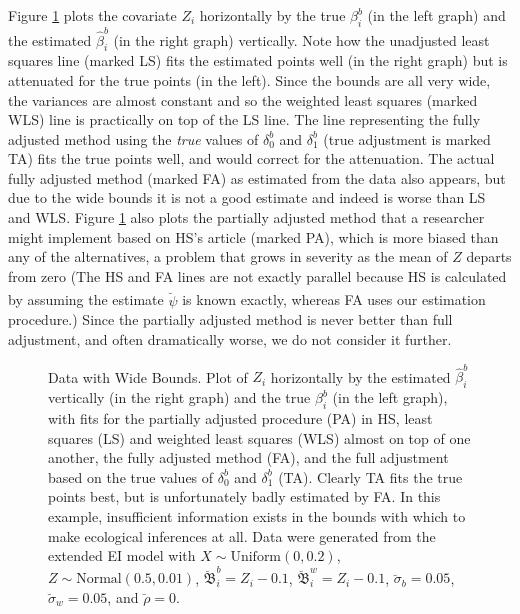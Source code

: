 \documentclass[11pt,titlepage]{article}
\newcommand{\bbeta}{{\mathfrak B}}
\newcommand{\sigmau}{\breve{\sigma}}
\newcommand{\rhou}{\breve{\rho}}
\newcommand{\psiu}{\breve{\psi}}
\begin{document}
Figure \ref{f:wide} plots the covariate $Z_i$ horizontally by the true
$\beta_i^b$ (in the left graph) and the estimated $\hat\beta_i^b$ (in
the right graph) vertically.  Note how the unadjusted least squares
line (marked LS) fits the estimated points well (in the right graph)
but is attenuated for the true points (in the left).  Since the
bounds are all very wide, the variances are almost constant and so the
weighted least squares (marked WLS) line is practically on top of the
LS line.  The line representing the fully adjusted method using the
\emph{true} values of $\delta_0^b$ and $\delta_1^b$ (true adjustment
is marked TA) fits the true points well, and would correct for the
attenuation.  The actual fully adjusted method (marked FA) as
estimated from the data also appears, but due to the wide bounds it is
not a good estimate and indeed is worse than LS and WLS.  Figure
\ref{f:wide} also plots the partially adjusted method that a
researcher might implement based on HS's article (marked PA), which is
more biased than any of the alternatives, a problem that grows in
severity as the mean of $Z$ departs from zero (The HS and FA lines are
not exactly parallel because HS is calculated by assuming the estimate
$\hat\psiu$ is known exactly, whereas FA uses our estimation
procedure.)  Since the partially adjusted method is never better than
full adjustment, and often dramatically worse, we do not consider it
further.
\begin{figure}[t]
  \begin{center}
    \caption{Data with Wide Bounds. Plot of $Z_i$ horizontally by
      the estimated $\hat\beta_i^b$ vertically (in the right graph)
      and the true $\beta_i^b$ (in the left graph), with fits for the
      partially adjusted procedure (PA) in HS, least squares (LS) and
      weighted least squares (WLS) almost on top of one another, the
      fully adjusted method (FA), and the full adjustment based on the
      true values of $\delta_0^b$ and $\delta_1^b$ (TA).  Clearly TA
      fits the true points best, but is unfortunately badly estimated
      by FA.  In this example, insufficient information exists in the
      bounds with which to make ecological inferences at all.  Data
      were generated from the extended EI model with $X \sim
      \textrm{Uniform}(0,0.2)$, $Z \sim \textrm{Normal}(0.5,0.01)$,
      $\breve\bbeta_i^b = Z_i - 0.1$, $\breve\bbeta_i^w = Z_i - 0.1$,
      $\sigmau_b = 0.05$, $\sigmau_w = 0.05$, and $\rhou = 0$.}
    \label{f:wide}
  \end{center}
\end{figure}
\end{document}
